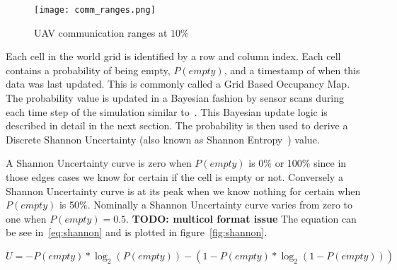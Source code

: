 \begin{multicols*}{2}
\begin{figure}[H]
	\centering
	\texttt{[image: comm\_ranges.png]}
	\caption{UAV communication ranges at $10\%$}
	\label{fig:comm_ranges}
\end{figure}

Each cell in the world grid is identified by a row and column index.  Each cell contains a probability of being empty, $P(empty)$, and a timestamp of when this data was last updated.  This is commonly called a Grid Based Occupancy Map. The probability value is updated in a Bayesian fashion by sensor scans during each time step of the simulation similar to~\cite{waharte}.  This Bayesian update logic is described in detail in the next section.  The probability is then used to derive a Discrete Shannon Uncertainty (also known as Shannon Entropy~\cite{shannon}) value.

A Shannon Uncertainty curve is zero when $P(empty)$ is 0\% or 100\% since in those edges cases we know for certain if the cell is empty or not.  Conversely a Shannon Uncertainty curve is at its peak when we know nothing for certain when $P(empty)$ is 50\%.  Nominally a Shannon Uncertainty curve varies from zero to one when $P(empty) = 0.5$. \textbf{TODO: multicol format issue}  The equation can be see in~\ref{eq:shannon} and is plotted in figure~\ref{fig:shannon}.

\end{multicols*}

\begin{equation}
\label{eq:shannon}
U = -P(empty) * \log_{2}(P(empty)) - ( 1-P(empty) * \log_{2}(1-P(empty)))
\end{equation}

